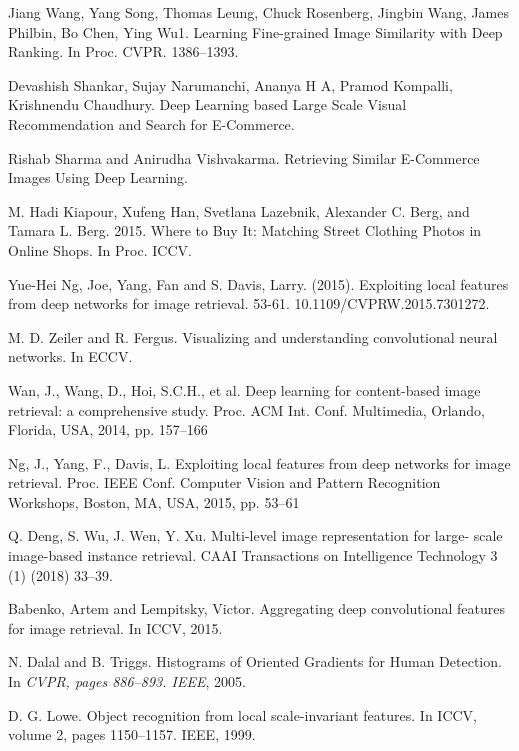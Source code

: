 \documentclass[10pt,twocolumn,letterpaper]{article}
\begin{document}
{\small
\begin{thebibliography}{10}\itemsep=-1pt

Jiang Wang, Yang Song, Thomas Leung, Chuck Rosenberg, Jingbin Wang, James Philbin, Bo Chen, Ying Wu1.
\newblock Learning Fine-grained Image Similarity with Deep Ranking.
\newblock In Proc. CVPR. 1386–1393.

Devashish Shankar, Sujay Narumanchi, Ananya H A, Pramod Kompalli, Krishnendu Chaudhury. 
\newblock Deep Learning based Large Scale Visual Recommendation and Search for E-Commerce.

Rishab Sharma and Anirudha Vishvakarma. 
\newblock Retrieving Similar E-Commerce Images Using Deep Learning.

M. Hadi Kiapour, Xufeng Han, Svetlana Lazebnik, Alexander C. Berg, and Tamara L. Berg. 2015. 
\newblock Where to Buy It: Matching Street Clothing Photos in Online Shops.
\newblock In Proc. ICCV.

Yue-Hei Ng, Joe, Yang, Fan and S. Davis, Larry. (2015). 
\newblock Exploiting local features from deep networks for image retrieval. 53-61. 10.1109/CVPRW.2015.7301272. 

M. D. Zeiler and R. Fergus. 
\newblock Visualizing and understanding convolutional neural networks. In ECCV.

Wan, J., Wang, D., Hoi, S.C.H., et al. 
\newblock Deep learning for content-based image retrieval: a comprehensive study.
\newblock Proc. ACM Int. Conf. Multimedia, Orlando, Florida, USA, 2014, pp. 157–166

Ng, J., Yang, F., Davis, L.
\newblock Exploiting local features from deep networks for image retrieval.
\newblock Proc. IEEE Conf. Computer Vision and Pattern Recognition Workshops, Boston, MA, USA, 2015, pp. 53–61

Q. Deng, S. Wu, J. Wen, Y. Xu.
\newblock Multi-level image representation for large- scale image-based instance retrieval.
\newblock CAAI Transactions on Intelligence Technology 3 (1) (2018) 33–39. 

Babenko, Artem and Lempitsky, Victor. 
\newblock Aggregating deep convolutional features for image retrieval.
\newblock In ICCV, 2015.

N. Dalal and B. Triggs.
\newblock Histograms of Oriented Gradients for Human Detection. 
\newblock In {\em CVPR, pages 886–893. IEEE}, 2005.

D. G. Lowe.
\newblock Object recognition from local scale-invariant features. 
\newblock In ICCV, volume 2, pages 1150–1157. IEEE, 1999.


\end{thebibliography}}
\end{document}
